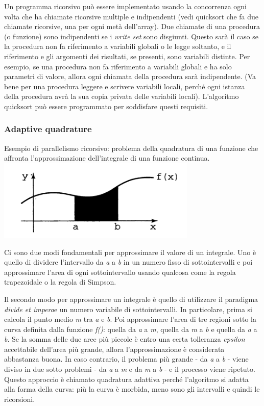 \documentclass[10pt,a4paper]{article}
\begin{document}
Un programma ricorsivo può essere implementato usando la concorrenza ogni volta che ha chiamate ricorsive multiple e indipendenti (vedi quicksort che fa due chiamate ricorsive, una per ogni metà dell'array).
Due chiamate di una procedura (o funzione) sono indipendenti se i \textit{write set} sono disgiunti. Questo sarà il caso se la procedura non fa riferimento a variabili globali o le legge soltanto, e il riferimento e gli argomenti dei risultati, se presenti, sono variabili distinte. Per esempio, se una procedura non fa riferimento a variabili globali e ha solo parametri di valore, allora ogni chiamata della procedura sarà indipendente. (Va bene per una procedura leggere e scrivere variabili locali, perché ogni istanza della procedura avrà la sua copia privata delle variabili locali). L'algoritmo quicksort può essere programmato per soddisfare questi requisiti.

\subsubsection{Adaptive quadrature}
Esempio di parallelismo ricorsivo: problema della quadratura di una funzione che affronta l'approssimazione dell'integrale di una funzione continua.\\
\includegraphics[scale=0.4]{img/integral.png}

Ci sono due modi fondamentali per approssimare il valore di un integrale. Uno è quello di dividere l'intervallo da \textit{a} a \textit{b} in un numero fisso di sottointervalli e poi approssimare l'area di ogni sottointervallo usando qualcosa come la regola trapezoidale o la regola di Simpson.

Il secondo modo per approssimare un integrale è quello di utilizzare il paradigma \textit{divide et impera}e un numero variabile di sottointervalli. In particolare, prima si calcola il punto medio \textit{m} tra \textit{a} e \textit{b}. Poi approssimare l'area di tre regioni sotto la curva definita dalla funzione \textit{f()}: quella da \textit{a} a \textit{m}, quella da \textit{m} a \textit{b} e quella da \textit{a} a \textit{b}. Se la somma delle due aree più piccole è entro una certa  tolleranza \textit{epsilon} accettabile dell'area più grande, allora l'approssimazione è considerata abbastanza buona. In caso contrario, il problema più grande - da \textit{a} a\textit{ b} - viene diviso in due sotto problemi - da \textit{a} a \textit{m} e da \textit{m} a \textit{b} - e il processo viene ripetuto. Questo approccio è chiamato quadratura adattiva perché l'algoritmo si adatta alla forma della curva: più la curva è morbida, meno sono gli intervalli e quindi le ricorsioni.
\end{document}
